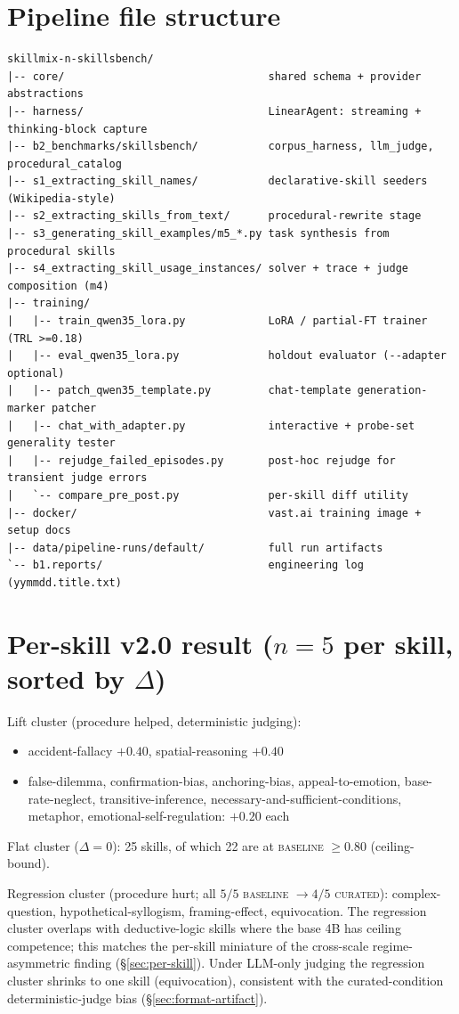 \documentclass[10pt]{article}
\newcommand{\BL}{\textsc{baseline}\xspace}
\newcommand{\CU}{\textsc{curated}\xspace}
\begin{document}
\section{Pipeline file structure}\label{app:pipeline}
{\small
\begin{verbatim}
skillmix-n-skillsbench/
|-- core/                                shared schema + provider abstractions
|-- harness/                             LinearAgent: streaming + thinking-block capture
|-- b2_benchmarks/skillsbench/           corpus_harness, llm_judge, procedural_catalog
|-- s1_extracting_skill_names/           declarative-skill seeders (Wikipedia-style)
|-- s2_extracting_skills_from_text/      procedural-rewrite stage
|-- s3_generating_skill_examples/m5_*.py task synthesis from procedural skills
|-- s4_extracting_skill_usage_instances/ solver + trace + judge composition (m4)
|-- training/
|   |-- train_qwen35_lora.py             LoRA / partial-FT trainer (TRL >=0.18)
|   |-- eval_qwen35_lora.py              holdout evaluator (--adapter optional)
|   |-- patch_qwen35_template.py         chat-template generation-marker patcher
|   |-- chat_with_adapter.py             interactive + probe-set generality tester
|   |-- rejudge_failed_episodes.py       post-hoc rejudge for transient judge errors
|   `-- compare_pre_post.py              per-skill diff utility
|-- docker/                              vast.ai training image + setup docs
|-- data/pipeline-runs/default/          full run artifacts
`-- b1.reports/                          engineering log (yymmdd.title.txt)
\end{verbatim}
}

\section{Per-skill v2.0 result ($n{=}5$ per skill, sorted by $\Delta$)}\label{app:per-skill}
Lift cluster (procedure helped, deterministic judging):
\begin{itemize}[leftmargin=*,nosep]
  \item accident-fallacy $+0.40$, spatial-reasoning $+0.40$
  \item false-dilemma, confirmation-bias, anchoring-bias, appeal-to-emotion, base-rate-neglect, transitive-inference, necessary-and-sufficient-conditions, metaphor, emotional-self-regulation: $+0.20$ each
\end{itemize}
Flat cluster ($\Delta = 0$): 25 skills, of which 22 are at \BL{} $\geq 0.80$ (ceiling-bound).

Regression cluster (procedure hurt; all $5/5$ \BL{} $\to 4/5$ \CU): complex-question, hypothetical-syllogism, framing-effect, equivocation. The regression cluster overlaps with deductive-logic skills where the base 4B has ceiling competence; this matches the per-skill miniature of the cross-scale regime-asymmetric finding (\S\ref{sec:per-skill}). Under LLM-only judging the regression cluster shrinks to one skill (equivocation), consistent with the curated-condition deterministic-judge bias (\S\ref{sec:format-artifact}).
\end{document}
